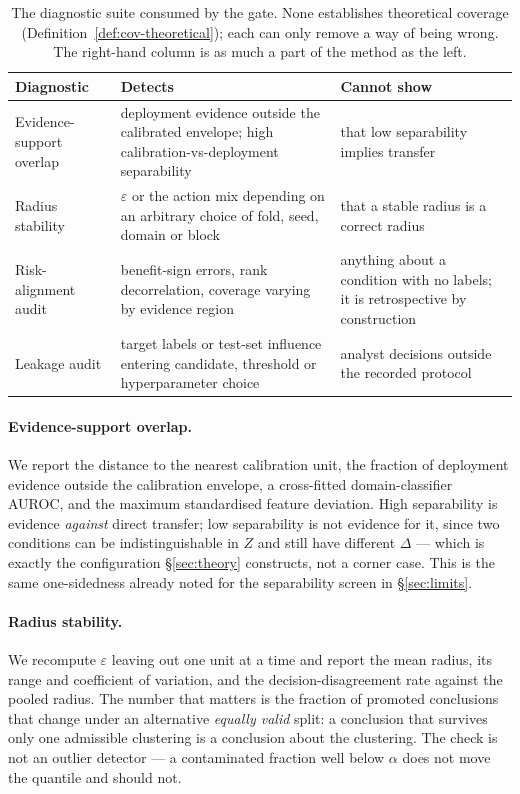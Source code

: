 \begin{table}[htbp]
\centering
\small
\caption{The diagnostic suite consumed by the gate. None establishes theoretical
coverage (Definition~\ref{def:cov-theoretical}); each can only remove a way of being
wrong. The right-hand column is as much a part of the method as the left.}
\label{tab:diagnostics}
\begin{tabular}{@{}p{}p{}p{}@{}}
\toprule
Diagnostic & Detects & Cannot show \\
\midrule
Evidence-support overlap
  & deployment evidence outside the calibrated envelope; high
    calibration-vs-deployment separability
  & that low separability implies transfer \\[2pt]
Radius stability
  & $\varepsilon$ or the action mix depending on an arbitrary choice of fold, seed,
    domain or block
  & that a stable radius is a correct radius \\[2pt]
Risk-alignment audit
  & benefit-sign errors, rank decorrelation, coverage varying by evidence region
  & anything about a condition with no labels; it is retrospective by construction \\[2pt]
Leakage audit
  & target labels or test-set influence entering candidate, threshold or
    hyperparameter choice
  & analyst decisions outside the recorded protocol \\
\bottomrule
\end{tabular}
\end{table}

\paragraph{Evidence-support overlap.} We report the distance to the nearest calibration
unit, the fraction of deployment evidence outside the calibration envelope, a
cross-fitted domain-classifier AUROC, and the maximum standardised feature deviation.
High separability is evidence \emph{against} direct transfer; low separability is not
evidence for it, since two conditions can be indistinguishable in $Z$ and still have
different $\Delta$ --- which is exactly the configuration \S\ref{sec:theory}
constructs, not a corner case. This is the same one-sidedness already noted for the
separability screen in \S\ref{sec:limits}.

\paragraph{Radius stability.} We recompute $\varepsilon$ leaving out one unit at a time
and report the mean radius, its range and coefficient of variation, and the
decision-disagreement rate against the pooled radius. The number that matters is the
fraction of promoted conclusions that change under an alternative \emph{equally valid}
split: a conclusion that survives only one admissible clustering is a conclusion about
the clustering. The check is not an outlier detector --- a contaminated fraction well
below $\alpha$ does not move the quantile and should not.

